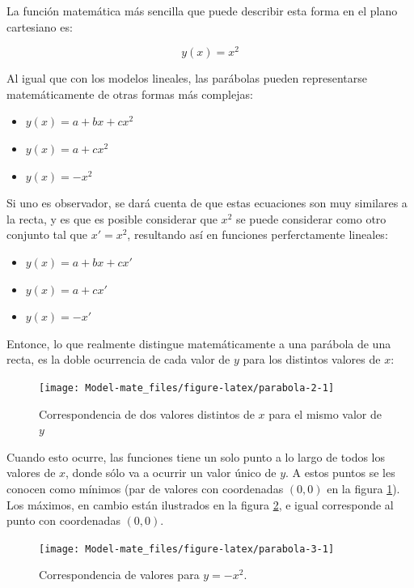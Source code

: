 \documentclass[
]{book}
\providecommand{\tightlist}{%
  \setlength{\itemsep}{0pt}\setlength{\parskip}{0pt}}
\begin{document}
La función matemática más sencilla que puede describir esta forma en el plano cartesiano es:

\begin{equation}
    y(x) = x^2
\end{equation}

Al igual que con los modelos lineales, las parábolas pueden representarse matemáticamente de otras formas más complejas:

\begin{itemize}
\tightlist
\item
  \(y(x) = a + bx + cx^2\)
\item
  \(y(x) = a + cx^2\)
\item
  \(y(x) = -x^2\)
\end{itemize}

Si uno es observador, se dará cuenta de que estas ecuaciones son muy similares a la recta, y es que es posible considerar que \(x^2\) se puede considerar como otro conjunto tal que \(x' = x^2\), resultando así en funciones perferctamente lineales:

\begin{itemize}
\tightlist
\item
  \(y(x) = a + bx + cx'\)
\item
  \(y(x) = a + cx'\)
\item
  \(y(x) = -x'\)
\end{itemize}

Entonce, lo que realmente distingue matemáticamente a una parábola de una recta, es la doble ocurrencia de cada valor de \(y\) para los distintos valores de \(x\):

\begin{figure}

{\centering \texttt{[image: Model-mate\_files/figure-latex/parabola-2-1]} 

}

\caption{Correspondencia de dos valores distintos de $x$ para el mismo valor de $y$}\label{fig:parabola-2}
\end{figure}

Cuando esto ocurre, las funciones tiene un solo punto a lo largo de todos los valores de \(x\), donde sólo va a ocurrir un valor único de \(y\). A estos puntos se les conocen como mínimos (par de valores con coordenadas \((0, 0)\) en la figura \ref{fig:parabola-2}). Los máximos, en cambio están ilustrados en la figura \ref{fig:parabola-3}, e igual corresponde al punto con coordenadas \((0, 0)\).

\begin{figure}

{\centering \texttt{[image: Model-mate\_files/figure-latex/parabola-3-1]} 

}

\caption{Correspondencia de valores para $y = -x^2$.}\label{fig:parabola-3}
\end{figure}
\end{document}
